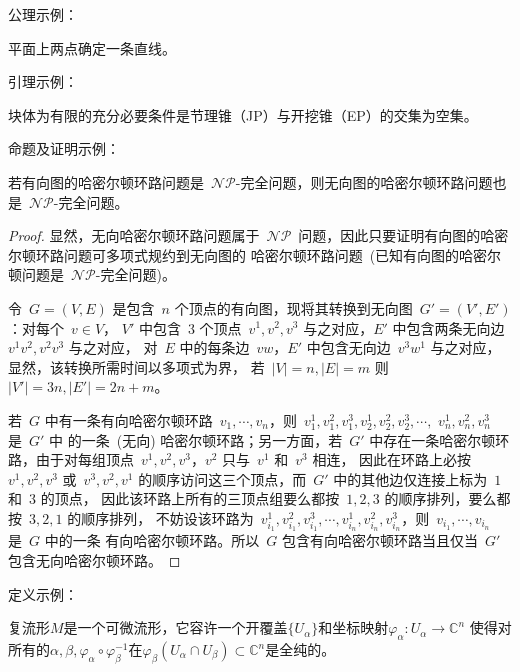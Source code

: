 公理示例：
\begin{axiom} \label{thm:samples:a}
平面上两点确定一条直线。
\end{axiom}

引理示例：
\begin{lemma} \label{thm:samples:l}
块体为有限的充分必要条件是节理锥（JP）与开挖锥（EP）的交集为空集。
\end{lemma}

命题及证明示例：
\newcommand{\sNP}{\ensuremath{\mathcal{NP}}}
\newcommand{\tNP}{\sNP\ }
\newcommand{\tNPC}{\mbox{\ensuremath{\mathcal{NP}\text{-完全}}}}
\begin{proposition} \label{thm:samples:p}
若有向图的哈密尔顿环路问题是~\tNPC 问题，则无向图的哈密尔顿环路问题也是~\tNPC 问题。
\end{proposition}

\begin{proof}
    显然，无向哈密尔顿环路问题属于~\tNP 问题，因此只要证明有向图的哈密尔顿环路问题可多项式规约到无向图的
    哈密尔顿环路问题~(已知有向图的哈密尔顿问题是~\tNPC 问题)。

    令~$G=(V,E)$ 是包含~$n$ 个顶点的有向图，现将其转换到无向图~$G'=(V',E')$：对每个~$v\in V$，
    $V'$ 中包含~$3$ 个顶点~$v^1,v^2,v^3$ 与之对应，$E'$ 中包含两条无向边~$v^1v^2,v^2v^3$ 与之对应，
    对~$E$ 中的每条边~$vw$，$E'$ 中包含无向边~$v^3w^1$ 与之对应，显然，该转换所需时间以多项式为界，
    若~$|V|=n,|E|=m$ 则~$|V'|=3n,|E'|=2n+m$。

    若~$G$ 中有一条有向哈密尔顿环路~$v_1,\cdots,v_n$，则~$v_1^1,v_1^2,v_1^3,v_2^1,v_2^2,v_2^3,\cdots,$ $v_n^1,v_n^2,v_n^3$ 是~$G'$ 中
    的一条~(无向) 哈密尔顿环路；另一方面，若~$G'$ 中存在一条哈密尔顿环路，由于对每组顶点~$v^1,v^2,v^3$，$v^2$ 只与~$v^1$ 和~$v^3$ 相连，
    因此在环路上必按~$v^1,v^2,v^3$ 或~$v^3,v^2,v^1$ 的顺序访问这三个顶点，而~$G'$ 中的其他边仅连接上标为~$1$ 和~$3$ 的顶点，
    因此该环路上所有的三顶点组要么都按~$1,2,3$ 的顺序排列，要么都按~$3,2,1$ 的顺序排列，
    不妨设该环路为~$v_{i_1}^1,v_{i_1}^2,v_{i_1}^3,\cdots,v_{i_n}^1,v_{i_n}^2,v_{i_n}^3$，则~$v_{i_1},\cdots,v_{i_n}$ 是~$G$ 中的一条
    有向哈密尔顿环路。所以~$G$ 包含有向哈密尔顿环路当且仅当~$G'$ 包含无向哈密尔顿环路。\qedhere
\end{proof}

定义示例：
\begin{definition}[复流形] \label{thm:samples:d}
复流形$M$是一个可微流形，它容许一个开覆盖$\{U_{\alpha}\}$和坐标映射$\varphi_{\alpha}:U_{\alpha}\rightarrow \mathbb{C}^n$ 使得对所有的$\alpha, \beta, \varphi_{\alpha}\circ \varphi_{\beta}^{-1}$在$\varphi_{\beta}(U_{\alpha}\cap U_{\beta})\subset \mathbb{C}^n$是全纯的。
\end{definition}

